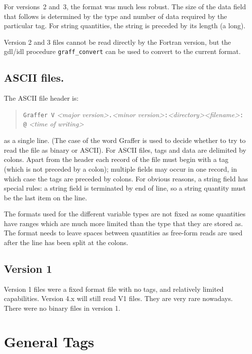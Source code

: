 \documentclass[english]{article}
\begin{document}
For versions~2 and~3, the format was much less robust.
The size of the data field that follows is determined by the
type and number of data required by the particular tag. For string quantities,
the string is preceded by its length (a long). 

Version 2 and 3 files cannot be read directly by the Fortran version,
but the gdl/idl procedure \texttt{graff\_convert} can be used to
convert to the current format.

\subsection{ASCII files.}

The ASCII file header is:
\begin{quote}
  \texttt{Graffer V} \emph{<major version>}\texttt{.}\emph{<minor
    version>}\texttt{:}\emph{<directory><filename>}\texttt{: @}
  \emph{<time of writing>}
\end{quote}
as a single line. (The case of the word Graffer is used to decide
whether to try to read the file as binary or ASCII).
For ASCII files, tags and data are delimited by colons. Apart from
the header each record of the file must begin with a tag (which is
not preceded by a colon); multiple fields may occur in one record,
in which case the tags are preceded by colons. For obvious reasons,
a string field has special rules: a string field is terminated by
end of line, so a string quantity must be the last item on the line.


The formats used for the different variable types are not fixed as
some quantities have ranges which are much more limited than the type
that they are stored as. The format needs to leave spaces between quantities
as free-form reads are used after the line has been split at the colons.

\subsection{Version 1}
\label{sec:vers1}

Version 1 files were a fixed format file with no tags, and relatively
limited capabilities. Version 4.x will still read V1 files. They are
very rare nowadays. There were no binary files in version 1.


\section{General Tags}
\end{document}

